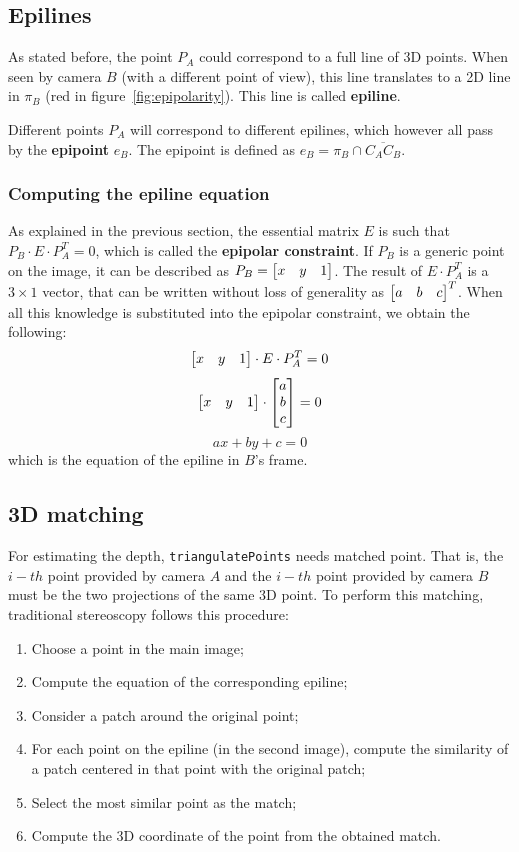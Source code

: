\subsection{Epilines}
\label{sec:backgr:stereo:epilines}

As stated before, the point $P_A$ could correspond to a full line of 3D points.
When seen by camera $B$ (with a different point of view), this line translates to a 2D line in $\pi_B$ (red in figure~\ref{fig:epipolarity}).
This line is called \textbf{epiline}.

Different points $P_A$ will correspond to different epilines, which however all pass by the \textbf{epipoint} $e_B$.
The epipoint is defined as $e_B = \pi_B \cap \overline{C_AC_B}$.

\subsubsection{Computing the epiline equation}

As explained in the previous section, the essential matrix $E$ is such that $P_B \cdot E \cdot P_A^T = 0$, which is called the \textbf{epipolar constraint}.
If $P_B$ is a generic point on the image, it can be described as $P_B = \begin{bmatrix} x & y & 1 \end{bmatrix}$.
The result of $E \cdot P_A^T$ is a $3\times 1$ vector, that can be written without loss of generality as $\begin{bmatrix} a & b & c \end{bmatrix}^T$.
When all this knowledge is substituted into the epipolar constraint, we obtain the following:
$$ \begin{bmatrix} x & y & 1 \end{bmatrix} \cdot E \cdot P_A^T = 0\\ $$
$$ \begin{bmatrix} x & y & 1 \end{bmatrix} \cdot \begin{bmatrix} a \\ b \\ c \end{bmatrix} = 0\\ $$
$$ ax + by + c = 0 $$
which is the equation of the epiline in $B$'s frame.

\subsection{3D matching}

For estimating the depth, \texttt{triangulatePoints} needs matched point.
That is, the $i{-}th$ point provided by camera $A$ and the $i{-}th$ point provided by camera $B$ must be the two projections of the same 3D point.
To perform this matching, traditional stereoscopy follows this procedure:
\begin{enumerate}
	\itemsep 0em
	\item Choose a point in the main image;
	\item Compute the equation of the corresponding epiline;
	\item Consider a patch around the original point;
	\item For each point on the epiline (in the second image), compute the similarity of a patch centered in that point with the original patch;
	\item Select the most similar point as the match;
	\item Compute the 3D coordinate of the point from the obtained match.
\end{enumerate}
